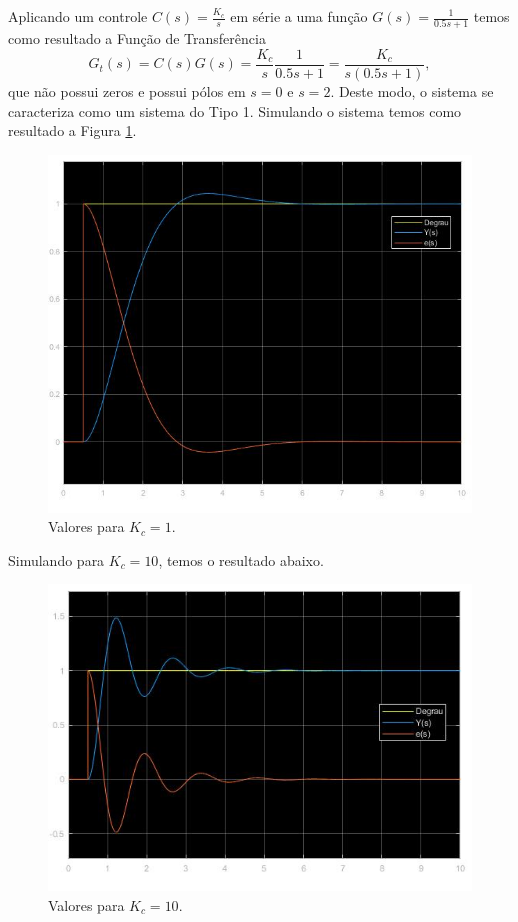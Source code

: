 \documentclass[
]{book}
\begin{document}
Aplicando um controle \(C(s) = \frac {K_c}{s}\) em série a uma função \(G(s) = \frac {1}{0.5s+1}\) temos como resultado a Função de Transferência\\
\[
G_t(s) = C(s)G(s) = \frac {K_c}{s} \frac{1}{0.5s+1} = \frac {K_c}{s(0.5s+1)},
\]
que não possui zeros e possui pólos em \(s = 0\) e \(s = 2\). Deste modo, o sistema se caracteriza como um sistema do Tipo 1. Simulando o sistema temos como resultado a Figura \ref{fig:fig42A1}.

\begin{figure}
\includegraphics[width=0.8\linewidth]{Imagens/Lab4/Resolução/prob2A1} \caption{Valores para $K_c = 1$.}\label{fig:fig42A1}
\end{figure}

Simulando para \(K_c = 10\), temos o resultado abaixo.

\begin{figure}
\includegraphics[width=0.8\linewidth]{Imagens/Lab4/Resolução/prob2A2} \caption{Valores para $K_c = 10$.}\label{fig:fig42A2}
\end{figure}
\end{document}
